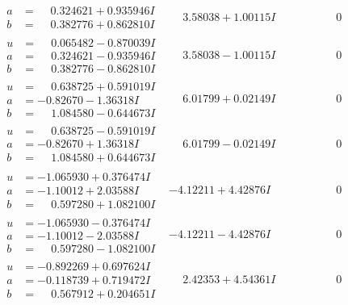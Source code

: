 \documentclass[1p]{elsarticle_modified}
\theoremstyle{definition}
\begin{document}
$$\begin{array}{c|c|c}
\begin{aligned}
a &= \phantom{-}0.324621 + 0.935946 I \\
b &= \phantom{-}0.382776 + 0.862810 I\end{aligned}
 & \phantom{-}3.58038 + 1.00115 I & \phantom{-0.000000 } 0 \\ \hline\begin{aligned}
u &= \phantom{-}0.065482 - 0.870039 I \\
a &= \phantom{-}0.324621 - 0.935946 I \\
b &= \phantom{-}0.382776 - 0.862810 I\end{aligned}
 & \phantom{-}3.58038 - 1.00115 I & \phantom{-0.000000 } 0 \\ \hline\begin{aligned}
u &= \phantom{-}0.638725 + 0.591019 I \\
a &= -0.82670 - 1.36318 I \\
b &= \phantom{-}1.084580 - 0.644673 I\end{aligned}
 & \phantom{-}6.01799 + 0.02149 I & \phantom{-0.000000 } 0 \\ \hline\begin{aligned}
u &= \phantom{-}0.638725 - 0.591019 I \\
a &= -0.82670 + 1.36318 I \\
b &= \phantom{-}1.084580 + 0.644673 I\end{aligned}
 & \phantom{-}6.01799 - 0.02149 I & \phantom{-0.000000 } 0 \\ \hline\begin{aligned}
u &= -1.065930 + 0.376474 I \\
a &= -1.10012 + 2.03588 I \\
b &= \phantom{-}0.597280 + 1.082100 I\end{aligned}
 & -4.12211 + 4.42876 I & \phantom{-0.000000 } 0 \\ \hline\begin{aligned}
u &= -1.065930 - 0.376474 I \\
a &= -1.10012 - 2.03588 I \\
b &= \phantom{-}0.597280 - 1.082100 I\end{aligned}
 & -4.12211 - 4.42876 I & \phantom{-0.000000 } 0 \\ \hline\begin{aligned}
u &= -0.892269 + 0.697624 I \\
a &= -0.118739 + 0.719472 I \\
b &= \phantom{-}0.567912 + 0.204651 I\end{aligned}
 & \phantom{-}2.42353 + 4.54361 I & \phantom{-0.000000 } 0 \\ \hline\begin{aligned}

\end{aligned}
\end{array}$$
\end{document}
